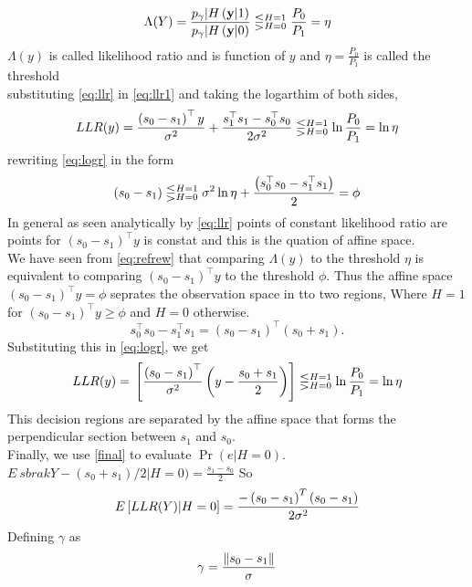 \begin{enumerate}
\begin{align}
\Lambda(Y)=\frac{p_\gamma|H \left(\mathbf{y}|1\right)}{p_\gamma|H \left(\mathbf{y}|0\right)} \lesseqgtr_{H=0}^{H=1}  \frac{P_0}{P_1} = \eta
\label{eq:llr1}
\end{align}
$\Lambda(y)$ is called likelihood ratio and is function of $y$ and $\eta =\frac{P_0}{P_1}$ is called the threshold \\
substituting \eqref{eq:llr} in \eqref{eq:llr1} and taking the logarthim of both sides,
\begin{align}
LLR(y) = \frac{\left( s_0 -s_1\right)^\top y}{\sigma^2}+\frac{s_1^\top s_1 - s_0^\top s_0}{2\sigma^2} \lesseqgtr_{H=0}^{H=1}  \ln\frac{P_0}{P_1} = \ln\eta
\label{eq:logr}
\end{align}
rewriting \ref{eq:logr} in the form 
\begin{align}
\left( s_0 -s_1\right) \lesseqgtr_{H=0}^{H=1} \sigma^2 \ln{\eta} + \frac{\left(s_0^\top s_0 -s_1^\top s_1\right)}{2} = \phi
\label{eq:refrew}
\end{align}
In general as seen analytically by \ref{eq:llr} points of constant likelihood ratio are points for $(s_0 -s_1)^\top y $ is constat and this is the quation of affine space.\\
We have seen from \ref{eq:refrew} that comparing $\Lambda(y)$ to the threshold $\eta$ is equivalent to comparing $(s_0 -s_1)^\top y $ to the threshold $\phi$. Thus the affine space $(s_0 -s_1)^\top y = \phi $ seprates the observation space in tto two regions, Where $ H =1$ for $(s_0 -s_1)^\top y \geq \phi $  and $ H=0$ otherwise.
\begin{equation}
s_0^\top s_0 -s_1^\top s_1 = (s_0 -s_1)^\top (s_0 +s_1).
\end{equation}
Substituting this in \eqref{eq:logr}, we get
\begin{align}
LLR(y)  = {}\left[\frac{\left(s_0 -s_1\right)^\top}{\sigma^2} \left(y - \frac{s_0 + s_1}{2} \right)\right] \lesseqgtr_{H=0}^{H=1} \ln\frac{P_0}{P_1} = \ln\eta
\label{final}
\end{align}
This decision regions are separated  by the affine space that forms the perpendicular section between $s_1$ and $s_0$. \\
Finally, we use \ref{final} to evaluate 
$\Pr(e | H =0)$. $E\
sbrak{ Y -(s_0 +s_1)/2|H=0)} = \frac{s_1 -s_0}{2}$ So
\begin{align}
E{}\left[LLR(Y)|H=0\right] = \frac{-\left(s_0 -s_1\right)^T\left(s_0 -s_1\right)}{2\sigma^2}
\end{align}
Defining $\gamma$ as
\begin{align}
\gamma = \frac{\norm{s_0 -s_1}}{\sigma}

\end{align}
\end{enumerate}
